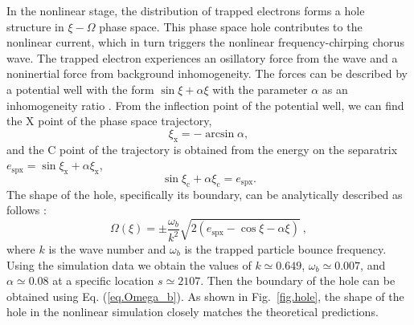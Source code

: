 \documentclass[times,12pt,3p,longtitle]{elsarticle}
\begin{document}
In the nonlinear stage, the distribution of trapped electrons forms a  hole structure in $\xi-\Omega$ phase space. This phase space hole contributes to the nonlinear current, which in turn triggers the nonlinear frequency-chirping chorus wave. 
The trapped electron experiences  an osillatory force from the wave and a noninertial force from background inhomogeneity. The forces can be described by a potential well with the form $\sin \xi + \alpha \xi$ with the parameter $\alpha$ as an inhomogeneity ratio \cite{omura2008,tao2020}.
From 
the inflection point of the potential well,
we can find the X point of the phase space trajectory, 
\begin{equation}
    \xi_\mathrm{x} = - \arcsin \alpha,
\end{equation}
and the C point of the trajectory is obtained from the energy on the separatrix $e_\mathrm{spx} = \sin \xi_\mathrm{x} + \alpha \xi_\mathrm{x}$,
\begin{equation}
    \sin \xi_\mathrm{c} + \alpha \xi_\mathrm{c} = e_\mathrm{spx}.
\end{equation}
The shape of the hole, specifically its boundary, can be analytically described as follows \cite{omura2008}:
\begin{equation}\label{eq.Omega_b}
    \Omega(\xi) = \pm \frac{\omega_b}{k^2} \sqrt{2 (e_\mathrm{spx}-\cos \xi - \alpha \xi)}~,
\end{equation}
where $k$ is the wave number and $\omega_b$
is the trapped particle bounce frequency.
Using
the simulation data we obtain the values of $k \simeq 0.649$, $\omega_b \simeq 0.007$, and $\alpha \simeq 0.08$ at a specific location $s\simeq 2107$. Then the boundary of the hole can be obtained using Eq. (\ref{eq.Omega_b}).
As shown 
in Fig.~\ref{fig.hole},
the shape of the hole in the nonlinear simulation
closely matches  the theoretical predictions.
\end{document}
